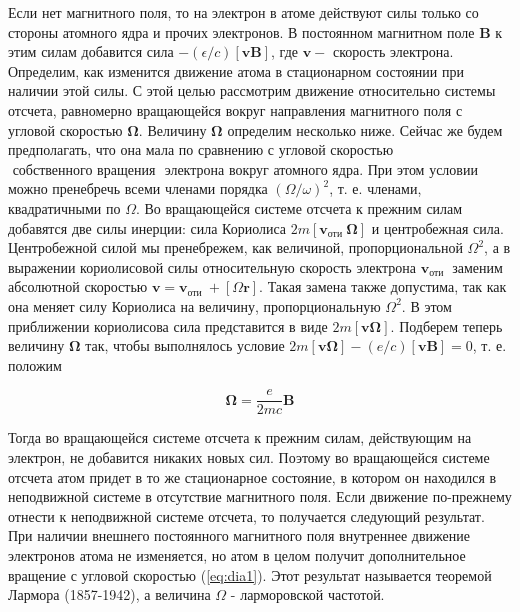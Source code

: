 \documentclass[12pt]{article}
\begin{document}
  Если нет магнитного поля, то на электрон в атоме действуют силы только со стороны атомного ядра и прочих электронов. В постоянном магнитном поле $\mathbf{B}$ к этим силам добавится сила $-(\epsilon / c)[\mathbf{v B}]$, где $\mathbf{v}-$ скорость электрона. Определим, как изменится движение атома в стационарном состоянии при наличии этой силы. С этой целью рассмотрим движение относительно системы отсчета, равномерно вращающейся
  вокруг направления магнитного поля с угловой скоростью $\boldsymbol{\Omega}$. Величину $\boldsymbol{\Omega}$ определим несколько ниже. Сейчас же будем предполагать, что она мала по сравнению с угловой скоростью $\boldsymbol{\text { собственного вращения }}$ электрона вокруг атомного ядра. При этом условии можно пренебречь всеми членами порядка $(\Omega / \omega)^2$, т. е. членами, квадратичными по $\Omega$. Во вращающейся системе отсчета к прежним силам добавятся две силы инерции: сила Кориолиса $2 m\left[\mathbf{v}_{\text {оти }} \boldsymbol{\Omega}\right]$ и центробежная сила. Центробежной силой мы пренебрежем, как величиной, пропорциональной $\Omega^2$, а в выражении кориолисовой силы относительную скорость электрона $\mathbf{v}_{\text {оти }}$ заменим абсолютной скоростью $\mathbf{v}=\mathbf{v}_{\text {оти }}+[\Omega \mathbf{r}]$. Такая замена также допустима, так как она меняет силу Кориолиса на величину, пропорциональную $\Omega^2$. В этом приближении кориолисова сила представится в виде $2 m[\mathbf{v} \boldsymbol{\Omega}]$. Подберем теперь величину $\boldsymbol{\Omega}$ так, чтобы выполнялось условие $2 m[\mathbf{v} \boldsymbol{\Omega}]-(e / c)[\mathbf{v B}]=0$, т. е. положим

  \begin{equation}
  \label{eq:dia1}
  \boldsymbol{\Omega}=\frac{e}{2 m c} \mathbf{B}
  \end{equation}

  Тогда во вращающейся системе отсчета к прежним силам, действующим на электрон, не добавится никаких новых сил. Поэтому во вращающейся системе отсчета атом придет в то же стационарное состояние, в котором он находился в неподвижной системе в отсутствие магнитного поля. Если движение по-прежнему отнести к неподвижной системе отсчета, то получается следующий результат. При наличии внешнего постоянного магнитного поля внутреннее движение электронов атома не изменяется, но атом в целом получит дополнительное вращение с угловой скоростью (\ref{eq:dia1}). Этот результат называется теоремой Лармора (1857-1942), а величина $\Omega$ - ларморовской частотой.
\end{document}
